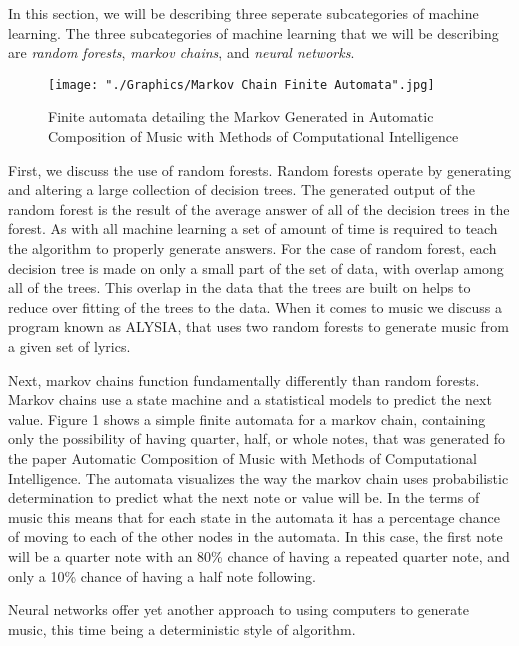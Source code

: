 \documentclass{sig-alternate}
\begin{document}
	In this section, we will be describing three seperate subcategories of machine learning. The three subcategories of machine learning that we will be describing are \textit{random forests},\textit{ markov chains}, and \textit{neural networks}. 



\begin{figure}[H]
	\texttt{[image: "./Graphics/Markov Chain Finite Automata".jpg]}
	\caption{Finite automata detailing the Markov Generated in Automatic Composition of Music with Methods of Computational Intelligence}
	\label{fig:markovchain1}
\end{figure}
	First, we discuss the use of random forests. Random forests operate by generating and altering a large collection of decision trees. The generated output of the random forest is the result of the average answer of all of the decision trees in the forest. As with all machine learning a set of amount of time is required to teach the algorithm to properly generate answers. For the case of random forest, each decision tree is made on only a small part of the set of data, with overlap among all of the trees. This overlap in the data that the trees are built on helps to reduce over fitting of the trees to the data. When it comes to music we discuss a program known as ALYSIA, that uses two random forests to generate music from a given set of lyrics.
	
	Next, markov chains function fundamentally differently than random forests. Markov chains use a state machine and a statistical models to predict the next value. Figure 1 shows a simple finite automata for a markov chain, containing only the possibility of having quarter, half, or whole notes, that was generated fo the paper Automatic Composition of Music with Methods of Computational Intelligence. The automata visualizes the way the markov chain uses probabilistic determination to predict what the next note or value will be. In the terms of music this means that for each state in the automata it has a percentage chance of moving to each of the other nodes in the automata. In this case, the first note will be a quarter note with an 80\% chance of having a repeated quarter note, and only a 10\% chance of having a half note following.

	Neural networks offer yet another approach to using computers to generate music, this time being a deterministic style of algorithm. 
\end{document}
